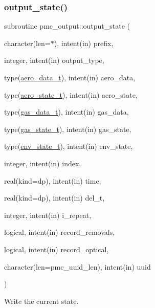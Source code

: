 \subsubsection{\texorpdfstring{output\+\_\+state()}{output\_state()}}
{\footnotesize\ttfamily subroutine pmc\+\_\+output\+::output\+\_\+state (\begin{DoxyParamCaption}\item[{character(len=$\ast$), intent(in)}]{prefix,  }\item[{integer, intent(in)}]{output\+\_\+type,  }\item[{type(\mbox{\hyperlink{structpmc__aero__data_1_1aero__data__t}{aero\+\_\+data\+\_\+t}}), intent(in)}]{aero\+\_\+data,  }\item[{type(\mbox{\hyperlink{structpmc__aero__state_1_1aero__state__t}{aero\+\_\+state\+\_\+t}}), intent(in)}]{aero\+\_\+state,  }\item[{type(\mbox{\hyperlink{structpmc__gas__data_1_1gas__data__t}{gas\+\_\+data\+\_\+t}}), intent(in)}]{gas\+\_\+data,  }\item[{type(\mbox{\hyperlink{structpmc__gas__state_1_1gas__state__t}{gas\+\_\+state\+\_\+t}}), intent(in)}]{gas\+\_\+state,  }\item[{type(\mbox{\hyperlink{structpmc__env__state_1_1env__state__t}{env\+\_\+state\+\_\+t}}), intent(in)}]{env\+\_\+state,  }\item[{integer, intent(in)}]{index,  }\item[{real(kind=dp), intent(in)}]{time,  }\item[{real(kind=dp), intent(in)}]{del\+\_\+t,  }\item[{integer, intent(in)}]{i\+\_\+repeat,  }\item[{logical, intent(in)}]{record\+\_\+removals,  }\item[{logical, intent(in)}]{record\+\_\+optical,  }\item[{character(len=pmc\+\_\+uuid\+\_\+len), intent(in)}]{uuid }\end{DoxyParamCaption})}



Write the current state. 


